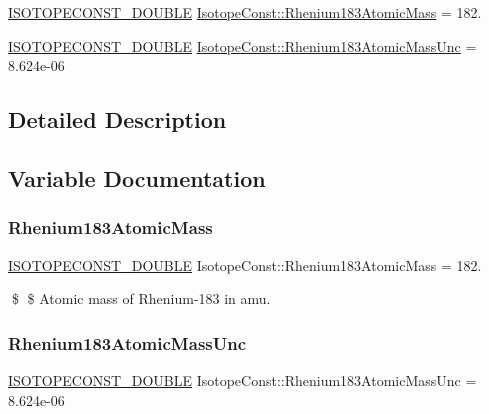 \begin{DoxyCompactItemize}
\item 
\mbox{\hyperlink{group___isotope_const-_macros_ga8f45a7272ce02c0b4c65c44636ed719a}{I\+S\+O\+T\+O\+P\+E\+C\+O\+N\+S\+T\+\_\+\+D\+O\+U\+B\+LE}} \mbox{\hyperlink{group___isotope_const-_rhenium-_re183_ga422a0f1aac2cd7a69a6278198697b700}{Isotope\+Const\+::\+Rhenium183\+Atomic\+Mass}} = 182.
\item 
\mbox{\hyperlink{group___isotope_const-_macros_ga8f45a7272ce02c0b4c65c44636ed719a}{I\+S\+O\+T\+O\+P\+E\+C\+O\+N\+S\+T\+\_\+\+D\+O\+U\+B\+LE}} \mbox{\hyperlink{group___isotope_const-_rhenium-_re183_ga3b6de1466604493d0e050fc7471c2ba9}{Isotope\+Const\+::\+Rhenium183\+Atomic\+Mass\+Unc}} = 8.\+624e-\/06
\end{DoxyCompactItemize}


\subsection{Detailed Description}


\subsection{Variable Documentation}
\mbox{\label{group___isotope_const-_rhenium-_re183_ga422a0f1aac2cd7a69a6278198697b700}} 
\subsubsection{\texorpdfstring{Rhenium183\+Atomic\+Mass}{Rhenium183AtomicMass}}
{\footnotesize\ttfamily \mbox{\hyperlink{group___isotope_const-_macros_ga8f45a7272ce02c0b4c65c44636ed719a}{I\+S\+O\+T\+O\+P\+E\+C\+O\+N\+S\+T\+\_\+\+D\+O\+U\+B\+LE}} Isotope\+Const\+::\+Rhenium183\+Atomic\+Mass = 182.}

\$ \$ Atomic mass of Rhenium-\/183 in amu. \mbox{\label{group___isotope_const-_rhenium-_re183_ga3b6de1466604493d0e050fc7471c2ba9}} 
\subsubsection{\texorpdfstring{Rhenium183\+Atomic\+Mass\+Unc}{Rhenium183AtomicMassUnc}}
{\footnotesize\ttfamily \mbox{\hyperlink{group___isotope_const-_macros_ga8f45a7272ce02c0b4c65c44636ed719a}{I\+S\+O\+T\+O\+P\+E\+C\+O\+N\+S\+T\+\_\+\+D\+O\+U\+B\+LE}} Isotope\+Const\+::\+Rhenium183\+Atomic\+Mass\+Unc = 8.\+624e-\/06}

